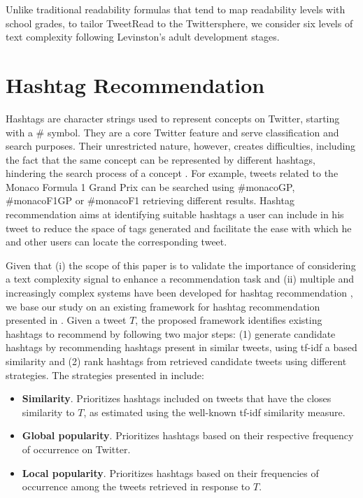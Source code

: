 \documentclass{sig-alternate-05-2015}
\begin{document}
Unlike traditional readability formulas that tend to map readability levels with school grades, to tailor TweetRead to the Twittersphere, we consider six levels of text complexity following Levinston's \cite{develop} adult development stages.

\section{Hashtag Recommendation}
Hashtags are character strings used to represent concepts on Twitter, starting with a \# symbol. They are a core Twitter feature and serve classification and search purposes. Their unrestricted nature, however, creates difficulties, including the fact that the same concept can be represented by different hashtags, hindering the search process of a concept \cite{hashtagRec}. For example, tweets related to the Monaco Formula 1 Grand Prix can be searched using \#monacoGP, \#monacoF1GP or \#monacoF1 retrieving different results. Hashtag recommendation aims at identifying suitable hashtags a user can include in his tweet to reduce the space of tags generated \cite{hashtagRec} and facilitate the ease with which he and other users can locate the corresponding tweet. 


Given that (i) the scope of this paper is to validate the importance of considering a text complexity signal to enhance a recommendation task and (ii) multiple and increasingly complex systems have been developed for hashtag recommendation \cite{lda}, we base our study on an existing framework for hashtag recommendation presented in \cite{hashtagRec}. Given a tweet $T$, the proposed framework identifies existing hashtags to recommend by following two major steps: (1) generate candidate hashtags by recommending hashtags present in similar tweets, using tf-idf a based similarity and (2) rank hashtags from retrieved candidate tweets using different strategies. The strategies presented in \cite{hashtagRec} include: 
\begin{itemize}
\item \textbf{Similarity}. Prioritizes hashtags included on tweets that have the closes similarity to $T$, as estimated using the well-known tf-idf  similarity measure. 
\item \textbf{Global popularity}. Prioritizes hashtags based on their respective frequency of occurrence on Twitter. 
\item \textbf{Local popularity}. Prioritizes hashtags based on their frequencies of occurrence among the tweets retrieved in response to $T$. 
\end{itemize}
\end{document}
